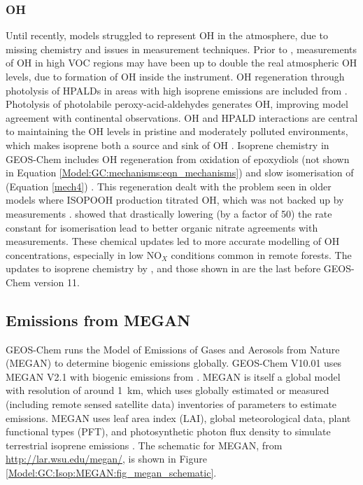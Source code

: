       
    \subsubsection{OH}
    
      Until recently, models struggled to represent OH in the atmosphere, due to missing chemistry and issues in measurement techniques.
      Prior to \textcite{Mao2012}, measurements of OH in high VOC regions may have been up to double the real atmospheric OH levels, due to formation of OH inside the instrument.
      OH regeneration through photolysis of HPALDs in areas with high isoprene emissions are included from \textcite{Peeters2010}.
      Photolysis of photolabile peroxy-acid-aldehydes generates OH, improving model agreement with continental observations.
      OH and HPALD interactions are central to maintaining the OH levels in pristine and moderately polluted environments, which makes isoprene both a source and sink of OH \parencite{Peeters2010,Taraborrelli2012}.
      Isoprene chemistry in GEOS-Chem includes OH regeneration from oxidation of epoxydiols (not shown in Equation \ref{Model:GC:mechanisms:eqn_mechanisms}) and slow isomerisation of \roo (Equation \ref{mech4}) \parencite{Mao2013}.
      This regeneration dealt with the problem seen in older models where ISOPOOH production titrated OH, which was not backed up by measurements \parencite{Paulot2009b,Mao2013}.
      \textcite{Mao2013} showed that drastically lowering (by a factor of 50) the rate constant for \roo isomerisation lead to better organic nitrate agreements with measurements.%
      These chemical updates led to more accurate modelling of OH concentrations, especially in low NO$_X$ conditions common in remote forests.
      The updates to isoprene chemistry by \textcite{Mao2013}, and those shown in \textcite{Crounse2011,Crounse2012} are the last before GEOS-Chem version 11.

  
  \subsection{Emissions from MEGAN}
    \label{Model:GC:MEGAN}
    
    
    GEOS-Chem runs the Model of Emissions of Gases and Aerosols from Nature (MEGAN) to determine biogenic emissions globally.
    GEOS-Chem V10.01 uses MEGAN V2.1 with biogenic emissions from \textcite{Guenther2012}.
    MEGAN is itself a global model with resolution of around 1~km, which uses globally estimated or measured (including remote sensed satellite data) inventories of parameters to estimate emissions.
    MEGAN uses leaf area index (LAI), global meteorological data, plant functional types (PFT), and photosynthetic photon flux density to simulate terrestrial isoprene emissions \parencite{Kefauver2014}.
    The schematic for MEGAN, from \url{http://lar.wsu.edu/megan/}, is shown in Figure \ref{Model:GC:Isop:MEGAN:fig_megan_schematic}.
    
